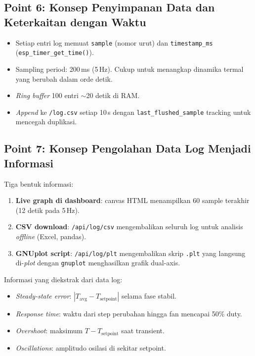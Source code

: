 \documentclass[11pt,a4paper]{article}
\begin{document}
\subsection{Point 6: Konsep Penyimpanan Data dan Keterkaitan dengan Waktu}

\begin{itemize}
    \item Setiap entri log memuat \texttt{sample} (nomor urut) dan \texttt{timestamp\_ms} (\texttt{esp\_timer\_get\_time()}).
    \item Sampling period: 200\,ms (5\,Hz). Cukup untuk menangkap dinamika termal yang berubah dalam orde detik.
    \item \emph{Ring buffer} 100 entri $\sim$20 detik di RAM.
    \item \emph{Append} ke \texttt{/log.csv} setiap 10\,s dengan \texttt{last\_flushed\_sample} tracking untuk mencegah duplikasi.
\end{itemize}

\subsection{Point 7: Konsep Pengolahan Data Log Menjadi Informasi}

Tiga bentuk informasi:
\begin{enumerate}
    \item \textbf{Live graph di dashboard}: canvas HTML menampilkan 60 sample terakhir (12 detik pada 5\,Hz).
    \item \textbf{CSV download}: \texttt{/api/log/csv} mengembalikan seluruh log untuk analisis \emph{offline} (Excel, pandas).
    \item \textbf{GNUplot script}: \texttt{/api/log/plt} mengembalikan skrip \texttt{.plt} yang langsung di-\emph{plot} dengan \texttt{gnuplot} menghasilkan grafik dual-axis.
\end{enumerate}

Informasi yang diekstrak dari data log:
\begin{itemize}
    \item \emph{Steady-state error}: $|T_\mathrm{avg} - T_\mathrm{setpoint}|$ selama fase stabil.
    \item \emph{Response time}: waktu dari step perubahan hingga fan mencapai 50\% duty.
    \item \emph{Overshoot}: maksimum $T - T_\mathrm{setpoint}$ saat transient.
    \item \emph{Oscillations}: amplitudo osilasi di sekitar setpoint.
\end{itemize}
\end{document}
